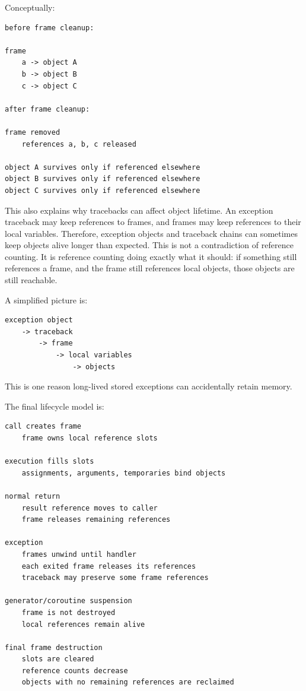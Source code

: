 Conceptually:

\begin{verbatim}
before frame cleanup:

frame
    a -> object A
    b -> object B
    c -> object C

after frame cleanup:

frame removed
    references a, b, c released

object A survives only if referenced elsewhere
object B survives only if referenced elsewhere
object C survives only if referenced elsewhere
\end{verbatim}

This also explains why tracebacks can affect object lifetime. An exception traceback may keep references to frames, and frames may keep references to their local variables. Therefore, exception objects and traceback chains can sometimes keep objects alive longer than expected. This is not a contradiction of reference counting. It is reference counting doing exactly what it should: if something still references a frame, and the frame still references local objects, those objects are still reachable.

A simplified picture is:

\begin{verbatim}
exception object
    -> traceback
        -> frame
            -> local variables
                -> objects
\end{verbatim}

This is one reason long-lived stored exceptions can accidentally retain memory.

The final lifecycle model is:

\begin{verbatim}
call creates frame
    frame owns local reference slots

execution fills slots
    assignments, arguments, temporaries bind objects

normal return
    result reference moves to caller
    frame releases remaining references

exception
    frames unwind until handler
    each exited frame releases its references
    traceback may preserve some frame references

generator/coroutine suspension
    frame is not destroyed
    local references remain alive

final frame destruction
    slots are cleared
    reference counts decrease
    objects with no remaining references are reclaimed
\end{verbatim}

